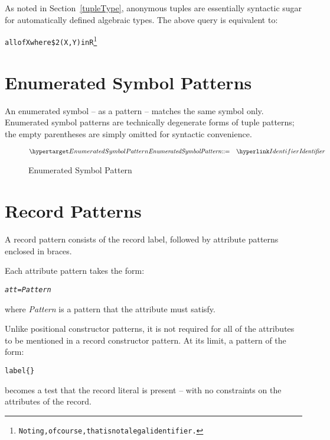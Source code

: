 \begin{aside}
As noted in Section~\vref{tupleType}, anonymous tuples are essentially syntactic sugar for automatically defined algebraic types. The above query is equivalent to:
\begin{alltt}
all of X where \$2(X,Y) in R\footnote{Noting, of course, that  is not a legal \Sr identifier.}
\end{alltt}

\end{aside}

\section{Enumerated Symbol Patterns}
\label{enumPattern}

An enumerated symbol -- as a pattern -- matches the same symbol only. Enumerated symbol patterns are technically degenerate forms of tuple patterns; the empty parentheses are simply omitted for syntactic convenience.

\begin{figure}[htbp]
\begin{eqnarray*}
\ntDef{EnumeratedSymbolPattern}&\arrow&\ntRef{Identifier}
\end{eqnarray*}
\caption{Enumerated Symbol Pattern}
\label{enumSumbolPtn}
\end{figure}

\section{Record Patterns}
\label{aggregateConPattern}
A record pattern consists of the record label, followed by attribute patterns enclosed in braces.

Each attribute pattern takes the form:
\begin{alltt}
\emph{att}=\emph{Pattern}
\end{alltt}
where \emph{Pattern} is a pattern that the  attribute must satisfy.

Unlike positional constructor patterns, it is not required for all of the attributes to be mentioned in a record constructor pattern. At its limit, a pattern of the form:
\begin{alltt}
label\{\}
\end{alltt}
becomes a test that the  record literal is present -- with no constraints on the attributes of the record.

